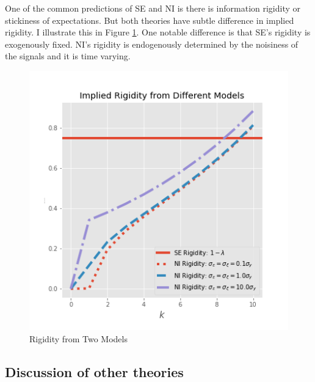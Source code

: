 \documentclass[]{article}
\begin{document}
	One of the common predictions of SE and NI is there is information rigidity or stickiness of expectations.  But both theories have subtle difference in implied rigidity. I illustrate this in Figure \ref{rigidity}. One notable difference is that SE's rigidity is exogenously fixed. NI's rigidity is endogenously determined by the noisiness of the signals and it is time varying. 
	
	\begin{figure}[ht]
		\centering
		\includegraphics[width=13cm]{figures/rigidity.png} 
		\caption{Rigidity from Two Models}
		\label{rigidity}
	\end{figure}
	
	
	\subsection{Discussion of other theories}
	
\end{document}
